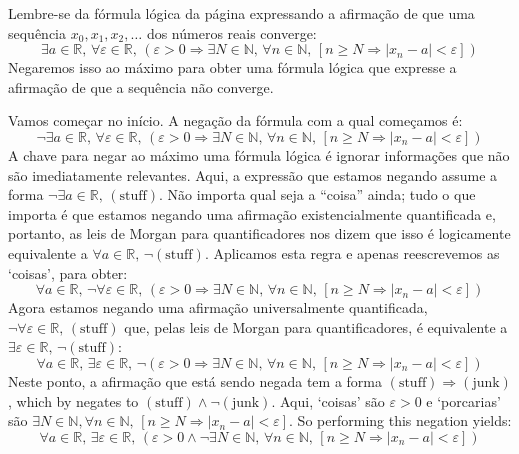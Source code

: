\begin{example}
Lembre-se da fórmula lógica da página \pageref{pConvergencePreliminary} expressando a afirmação de que uma sequência $x_0, x_1, x_2, \dots$  \pageref{pConvergencePreliminary} dos números reais converge:
\[ \exists a \in \mathbb{R},\, \forall \varepsilon \in \mathbb{R},\, (\varepsilon > 0 \Rightarrow \exists N \in \mathbb{N},\, \forall n \in \mathbb{N},\, [n \ge N \Rightarrow |x_n-a| < \varepsilon])\]
Negaremos isso ao máximo para obter uma fórmula lógica que expresse a afirmação de que a sequência não converge.

Vamos começar no início. A negação da fórmula com a qual começamos é:
\[ \neg \exists a \in \mathbb{R},\, \forall \varepsilon \in \mathbb{R},\, (\varepsilon > 0 \Rightarrow \exists N \in \mathbb{N},\, \forall n \in \mathbb{N},\, [n \ge N \Rightarrow |x_n-a| < \varepsilon])\]
%
A chave para negar ao máximo uma fórmula lógica é ignorar informações que não são imediatamente relevantes. Aqui, a expressão que estamos negando assume a forma $\neg \exists a \in \mathbb{R},\, (\text{stuff})$. Não importa qual seja a “coisa” ainda; tudo o que importa é que estamos negando uma afirmação existencialmente quantificada e, portanto, as leis de Morgan para quantificadores nos dizem que isso é logicamente equivalente a $\forall a \in \mathbb{R},\, \neg (\text{stuff} )$. Aplicamos esta regra e apenas reescrevemos as `coisas', para obter:
\[ \forall a \in \mathbb{R},\, \neg \forall \varepsilon \in \mathbb{R},\, (\varepsilon > 0 \Rightarrow \exists N \in \mathbb{N},\, \forall n \in \mathbb{N},\, [n \ge N \Rightarrow |x_n-a| < \varepsilon])\]
%
Agora estamos negando uma afirmação universalmente quantificada, $\neg \forall \varepsilon \in \mathbb{R},\, (\text{stuff})$ que, pelas leis de Morgan para quantificadores, é equivalente a $\exists \varepsilon \in \mathbb{R},\, \neg (\text{stuff})$:
\[ \forall a \in \mathbb{R},\, \exists \varepsilon \in \mathbb{R},\, \neg (\varepsilon > 0 \Rightarrow \exists N \in \mathbb{N},\, \forall n \in \mathbb{N},\, [n \ge N \Rightarrow |x_n-a| < \varepsilon])\]
%
Neste ponto, a afirmação que está sendo negada tem a forma $(\text{stuff}) \Rightarrow (\text{junk})$, which by  negates to $(\text{stuff}) \wedge \neg (\text{junk})$. Aqui, `coisas' são $\varepsilon > 0$ e `porcarias' são $\exists N \in \mathbb{N}, \forall n \in \mathbb{N},\, [n \ge N \Rightarrow |x_n - a| < \varepsilon]$. So performing this negation yields:
\[ \forall a \in \mathbb{R},\, \exists \varepsilon \in \mathbb{R},\, (\varepsilon > 0 \wedge \neg \exists N \in \mathbb{N},\, \forall n \in \mathbb{N},\, [n \ge N \Rightarrow |x_n-a| < \varepsilon])\]

\end{example}
